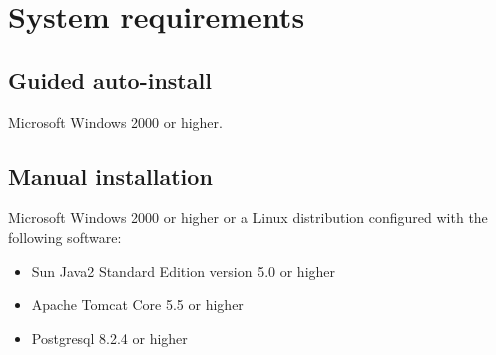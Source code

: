 \section{System requirements}
\subsection{Guided auto-install}
Microsoft Windows 2000 or higher.
\subsection{Manual installation}
Microsoft Windows 2000 or higher or a Linux distribution configured with the following software:
\begin{itemize}
\item Sun Java2 Standard Edition version 5.0 or higher
\item Apache Tomcat Core 5.5 or higher
\item Postgresql 8.2.4 or higher
\end{itemize}
